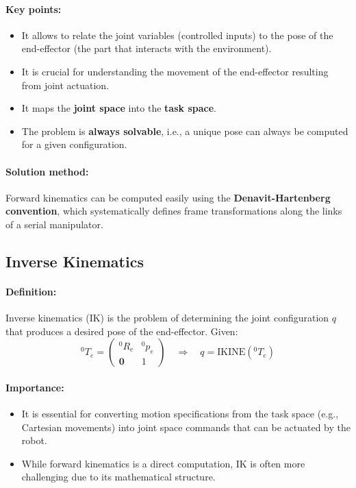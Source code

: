 \paragraph{Key points:}
\begin{itemize}
  \item It allows to relate the joint variables (controlled inputs) to the pose of the end-effector (the part that interacts with the environment).
  \item It is crucial for understanding the movement of the end-effector resulting from joint actuation.
  \item It maps the \textbf{joint space} into the \textbf{task space}.
  \item The problem is \textbf{always solvable}, i.e., a unique pose can always be computed for a given configuration.
\end{itemize}

\paragraph{Solution method:}
Forward kinematics can be computed easily using the \textbf{Denavit-Hartenberg convention}, which systematically defines frame transformations along the links of a serial manipulator.

\hfill

\subsection{Inverse Kinematics}

\paragraph{Definition:}
Inverse kinematics (IK) is the problem of determining the joint configuration $q$ that produces a desired pose of the end-effector. Given:
\[
{}^0T_e = 
\begin{pmatrix}
{}^0R_e & {}^0p_e \\
\mathbf{0} & 1
\end{pmatrix}
\quad \Rightarrow \quad q = \text{IKINE}({}^0T_e)
\]

\paragraph{Importance:}
\begin{itemize}
  \item It is essential for converting motion specifications from the task space (e.g., Cartesian movements) into joint space commands that can be actuated by the robot.
  \item While forward kinematics is a direct computation, IK is often more challenging due to its mathematical structure.
\end{itemize}

